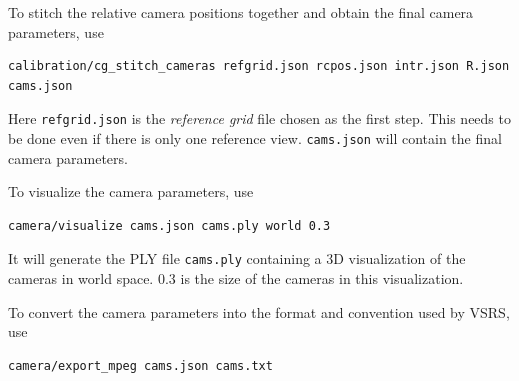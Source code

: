 \documentclass{scrreprt}
\begin{document}
To stitch the relative camera positions together and obtain the final camera parameters, use
\begin{lstlisting}[language=bash]
calibration/cg_stitch_cameras refgrid.json rcpos.json intr.json R.json
cams.json
\end{lstlisting}
Here \texttt{refgrid.json} is the \emph{reference grid} file chosen as the first step. This needs to be done even if there is only one reference view. \texttt{cams.json} will contain the final camera parameters.

To visualize the camera parameters, use
\begin{lstlisting}[language=bash]
camera/visualize cams.json cams.ply world 0.3
\end{lstlisting}
It will generate the PLY file \texttt{cams.ply} containing a 3D visualization of the cameras in world space. $0.3$ is the size of the cameras in this visualization.

To convert the camera parameters into the format and convention used by VSRS, use
\begin{lstlisting}[language=bash]
camera/export_mpeg cams.json cams.txt
\end{lstlisting}
\end{document}
